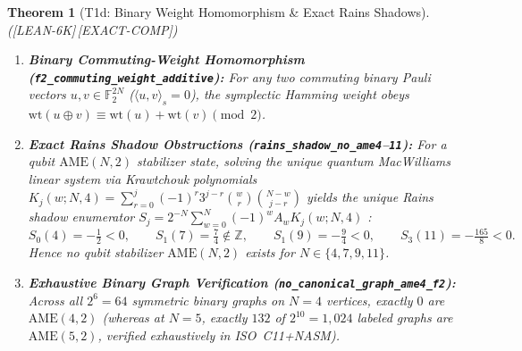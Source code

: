\documentclass[11pt,reqno]{amsart}
\newtheorem{theorem}{Theorem}[section]
\theoremstyle{definition}
\newcommand{\ZZ}{\mathbb{Z}}
\newcommand{\FF}{\mathbb{F}}
\newcommand{\AME}{\mathrm{AME}}
\newcommand{\lid}[1]{{\footnotesize\nolinkurl{#1}}}
\newcommand{\tagL}{\textsf{\footnotesize[LEAN-6K]}}
\newcommand{\tagE}{\textsf{\footnotesize[EXACT-COMP]}}
\begin{document}
\begin{theorem}[T1d: Binary Weight Homomorphism \& Exact Rains Shadows]
\label{thm:t1d}
\textup{(\tagL\,\tagE)}
\begin{enumerate}[label=(\alph*)]
  \item \textbf{Binary Commuting-Weight Homomorphism (\lid{f2_commuting_weight_additive}):}
    For any two commuting binary Pauli vectors $u, v \in \FF_2^{2N}$ ($\langle u, v\rangle_s
    = 0$), the symplectic Hamming weight obeys $\mathrm{wt}(u \oplus v) \equiv
    \mathrm{wt}(u) + \mathrm{wt}(v) \pmod 2$.
  \item \textbf{Exact Rains Shadow Obstructions (\lid{rains_shadow_no_ame4}--\lid{11}):}
    For a qubit $\AME(N, 2)$ stabilizer state, solving the unique quantum MacWilliams
    linear system via Krawtchouk polynomials $K_j(w; N, 4) = \sum_{r=0}^j (-1)^r 3^{j-r}
    \binom{w}{r}\binom{N-w}{j-r}$ yields the unique Rains shadow enumerator
    $S_j = 2^{-N}\sum_{w=0}^N (-1)^w A_w K_j(w; N, 4)$ \cite{rains1998shadow,
    huber2017seven,huber2018bounds}:
    \[
      S_0(4) = -\tfrac{1}{2} < 0, \qquad
      S_1(7) = \tfrac{7}{4} \notin \ZZ, \qquad
      S_1(9) = -\tfrac{9}{4} < 0, \qquad
      S_3(11) = -\tfrac{165}{8} < 0.
    \]
    Hence no qubit stabilizer $\AME(N, 2)$ exists for $N \in \{4, 7, 9, 11\}$.
  \item \textbf{Exhaustive Binary Graph Verification (\lid{no_canonical_graph_ame4_f2}):}
    Across all $2^6 = 64$ symmetric binary graphs on $N = 4$ vertices, exactly $0$ are
    $\AME(4, 2)$ (whereas at $N = 5$, exactly $132$ of $2^{10} = 1{,}024$ labeled graphs
    are $\AME(5, 2)$, verified exhaustively in ISO~C11+NASM).
\end{enumerate}
\end{theorem}
\end{document}
